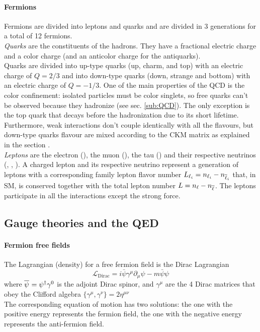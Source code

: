 \paragraph*{Fermions}
Fermions are divided into leptons and quarks and are divided in 3 generations for a total of 12 fermions.\\
\emph{Quarks} are the constituents of the hadrons. They have a fractional electric charge and a color charge (and an anticolor charge for the antiquarks).\\
Quarks are divided into up-type quarks (up, charm, and top) with an electric charge of $Q=2/3$ and into down-type quarks (down, strange and bottom) with an electric charge of $Q=-1/3$.
One of the main properties of the QCD is the color confinement: isolated particles must be color singlets, so free quarks can't be observed because they hadronize (see sec. \ref{sub:QCD}).
The only exception is the top quark that decays before the hadronization due to its short lifetime.\\
Furthermore, weak interactions don't couple identically with all the flavours, but down-type quarks flavour are mixed according to the CKM matrix as explained in the section \ADDREF.\\
\emph{Leptons} are the electron (\Pe), the muon (\PGm), the tau (\PGt) and their respective neutrinos (\PGne, \PGnGm, \PGnGt).
A charged lepton and its respective neutrino represent a generation of leptons with a corresponding family lepton flavor number $L_{\ell_i}=n_{\ell_i}-n_{{\overline{\ell}}_i}$ that, in SM, is conserved together with the total lepton number $L=n_\ell-n_{\overline{\ell}}$.
The leptons participate in all the interactions except the strong force.\\


\subsection{Gauge theories and the QED}\label{sub:gauge_qed}
\paragraph*{Fermion free fields}
The Lagrangian (density) for a free fermion field is the Dirac Lagrangian
\begin{equation}\label{eq:Dirac}
\mathcal{L}_{\text{Dirac}}=i\bar{\psi}\gamma^{\mu}\partial_{\mu}\psi-m\bar{\psi}\psi
\end{equation}
where $\aff{\psi}{}=\ff{\psi}{}^\dagger\gamma^0$ is the adjoint Dirac spinor, and $\gamma^\mu$ are the 4 Dirac matrices that obey the Clifford algebra $\{\gamma^\mu,\gamma^\nu\}=2\eta^{\mu\nu}$\\
The corresponding equation of motion has two solutions: the one with the positive energy represents the fermion field, the one with the negative energy represents the anti-fermion field.\\
